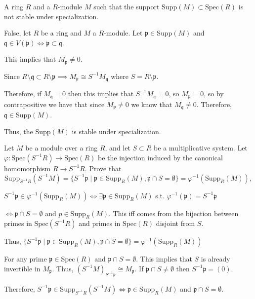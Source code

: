 \documentclass[12pt, letterpaper]{article}
\newcommand{\p}{\mathfrak{p}}
\newcommand{\Spec}{\mathrm{Spec}}
\newcommand{\Supp}{\mathrm{Supp}}
\newcommand{\mf}[1]{\mathfrak{#1}}
\begin{document}
\begin{subproblem}{}
    A ring $R$ and a $R$-module $M$ such that the support $\mathrm{Supp}(M ) \subset \Spec(R)$ is not stable
under specialization.
\end{subproblem}
\begin{problemproof}
    False, let $R$ be a ring and $M$ a $R$-module. Let $\p \in \Supp(M)$ and $\mf{q} \in V(\p) \iff \p \subset \mf{q}$.

    This implies that $M_\p \neq 0$. 
    
    Since $R \setminus \mf{q} \subset R \setminus \p \implies M_\p \cong S^{-1}M_\mf{q}$ where $S=R \setminus \p$.

    Therefore, if $M_\mf{q} = 0$ then this implies that $S^{-1}M_\mf{q} = 0$, so $M_\p =0$, so by contrapositive we have that since  $M_\p \neq 0$ we know  that $M_{\mf{q}} \neq 0$. Therefore, $\mf{q} \in \Supp(M)$.

    Thus, the $\Supp(M)$ is stable under specialization.
\end{problemproof}

\begin{problem}{}
    Let $M$ be a module over a ring $R$, and let $S \subset R$ be a multiplicative system. Let
$\varphi : \Spec(S^{-1}R) \to \Spec(R)$ be the injection induced by the canonical homomorphism
$R \to S^{-1}R$. Prove that
\[\mathrm{Supp}_{S^{-1}R}(S^{-1}M ) = \{S^{-1}\p \mid \p \in \mathrm{Supp}_R(M ), \p \cap S = \emptyset\} = \varphi^{-1}(\mathrm{Supp}_R(M )),\]
\end{problem}
\begin{problemproof}
    $S^{-1}\p \in \varphi^{-1}(\mathrm{Supp}_R(M)) \iff \exists \p \in \mathrm{Supp}_R(M)$ s.t. $\varphi^{-1}(\p)=S^{-1}\p$

    $\iff \p \cap S = \emptyset$ and $p \in \mathrm{Supp}_R(M)$. This iff comes from the bijection between primes in $\Spec(S^{-1}R)$ and primes in $\Spec(R)$ disjoint from $S$.

    Thus, $\{S^{-1}\p \mid \p \in \mathrm{Supp}_R(M), \p \cap S = \emptyset\}=\varphi^{-1}(\mathrm{Supp}_R(M))$

    For any prime $\p \in \Spec(R)$ and $\p \cap S=\emptyset$. This implies that $S$ is already invertible in $M_\p$. Thus, $(S^{-1}M)_{S^{-1}\p} \cong M_\p$. If $\p \cap S \neq \emptyset$ then $S^{-1}\p=(0)$.

    Therefore, $S^{-1}\p \in \mathrm{Supp}_{S^{-1}R}(S^{-1}M) \iff \p \in \mathrm{Supp}_R(M)$ and $\p \cap S = \emptyset$.
\end{problemproof}
\end{document}
